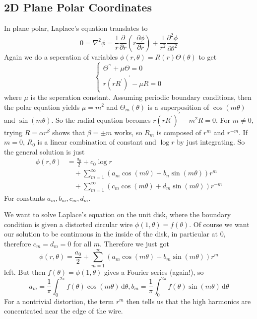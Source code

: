 \subsection{2D Plane Polar Coordinates}
In plane polar, Laplace's equation translates to
$$0=\nabla^2\phi=\frac{1}{r}\frac{\partial}{\partial r}\left( r\frac{\partial\phi}{\partial r} \right)+\frac{1}{r^2}\frac{\partial^2\phi}{\partial\theta^2}$$
Again we do a seperation of variables $\phi(r,\theta)=R(r)\Theta(\theta)$ to get
$$\begin{cases}
    \Theta^{\prime\prime}+\mu\Theta=0\\
    r(rR^\prime)^\prime-\mu R=0
\end{cases}$$
where $\mu$ is the seperation constant.
Assuming periodic boundary conditions, then the polar equation yields $\mu=m^2$ and $\Theta_m(\theta)$ is a superposition of $\cos(m\theta)$ and $\sin(m\theta)$.
So the radial equation becomes $r(rR^\prime)^\prime-m^2R=0$.
For $m\neq 0$, trying $R=\alpha r^\beta$ shows that $\beta=\pm m$ works, so $R_m$ is composed of $r^m$ and $r^{-m}$.
If $m=0$, $R_0$ is a linear combination of constant and $\log r$ by just integrating.
So the general solution is just
\begin{align*}
    \phi(r,\theta)&=\frac{a_0}{2}+c_0\log r\\
    &\quad+\sum_{m=1}^\infty(a_m\cos(m\theta)+b_n\sin(m\theta))r^m\\
    &\quad+\sum_{m=1}^\infty(c_m\cos(m\theta)+d_m\sin(m\theta))r^{-m}
\end{align*}
For constants $a_m,b_m,c_m,d_m$.
\begin{example}
    We want to solve Laplace's equation on the unit disk, where the boundary condition is given a distorted circular wire $\phi(1,\theta)=f(\theta)$.
    Of course we want our solution to be continuous in the inside of the disk, in particular at $0$, therefore $c_m=d_m=0$ for all $m$.
    Therefore we just got
    $$\phi(r,\theta)=\frac{a_0}{2}+\sum_{m=1}^\infty(a_m\cos(m\theta)+b_m\sin(m\theta))r^m$$
    left.
    But then $f(\theta)=\phi(1,\theta)$ gives a Fourier series (again!), so
    $$a_m=\frac{1}{\pi}\int_0^{2\pi}f(\theta)\cos(m\theta)\,\mathrm d\theta,b_m=\frac{1}{\pi}\int_0^{2\pi}f(\theta)\sin(m\theta)\,\mathrm d\theta$$
    For a nontrivial distortion, the term $r^m$ then tells us that the high harmonics are concentrated near the edge of the wire.
\end{example}
